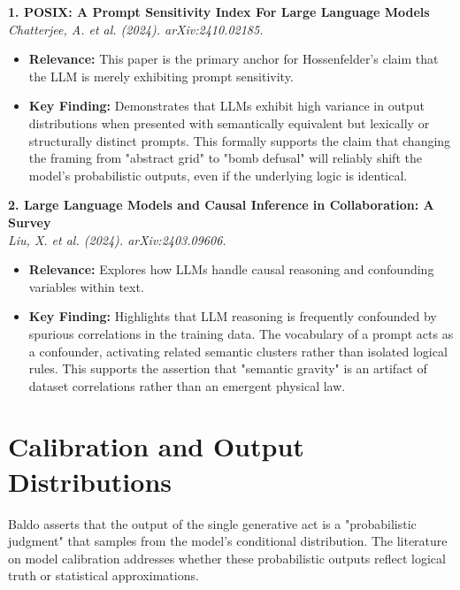 \documentclass[12pt,a4paper]{article}
\begin{document}
\vspace{1em}
\noindent\textbf{1. POSIX: A Prompt Sensitivity Index For Large Language Models}\\
\textit{Chatterjee, A. et al. (2024). arXiv:2410.02185.}
\begin{itemize}
    \item \textbf{Relevance:} This paper is the primary anchor for Hossenfelder's claim that the LLM is merely exhibiting prompt sensitivity.
    \item \textbf{Key Finding:} Demonstrates that LLMs exhibit high variance in output distributions when presented with semantically equivalent but lexically or structurally distinct prompts. This formally supports the claim that changing the framing from "abstract grid" to "bomb defusal" will reliably shift the model's probabilistic outputs, even if the underlying logic is identical.
\end{itemize}

\vspace{1em}
\noindent\textbf{2. Large Language Models and Causal Inference in Collaboration: A Survey}\\
\textit{Liu, X. et al. (2024). arXiv:2403.09606.}
\begin{itemize}
    \item \textbf{Relevance:} Explores how LLMs handle causal reasoning and confounding variables within text.
    \item \textbf{Key Finding:} Highlights that LLM reasoning is frequently confounded by spurious correlations in the training data. The vocabulary of a prompt acts as a confounder, activating related semantic clusters rather than isolated logical rules. This supports the assertion that "semantic gravity" is an artifact of dataset correlations rather than an emergent physical law.
\end{itemize}

\section{Calibration and Output Distributions}

Baldo asserts that the output of the single generative act is a "probabilistic judgment" that samples from the model's conditional distribution. The literature on model calibration addresses whether these probabilistic outputs reflect logical truth or statistical approximations.
\end{document}
